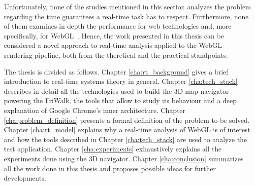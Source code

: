 Unfortunately, none of the studies mentioned in this section analyzes the problem
regarding the time guarantees a real-time task has to respect. Furthermore, none of them
examines in depth the performance for web technologies and, more specifically,
for WebGL~\cite{webgl}. Hence, the work presented in this thesis can be considered
a novel approach to real-time analysis applied to the WebGL rendering pipeline,
both from the theretical and the practical standpoints.

The thesis is divided as follows. Chapter \ref{cha:rt_background}
gives a brief introduction to real-time systems theory in general. Chapter
\ref{cha:tech_stack} describes in detail all the technologies used to build the
3D map navigator powering the FriWalk, the tools that allow to study its
behaviour and a deep explanation of Google Chrome's
inner architecture. Chapter \ref{cha:problem_definition} presents a formal definition
of the problem to be solved. Chapter \ref{cha:rt_model}
explains why a real-time analysis of WebGL is of interest and how the tools
described in Chapter \ref{cha:tech_stack} are used to analyze the test application.
Chapter \ref{cha:experiments} exhaustively explains all the experiments done using
the 3D navigator. Chapter \ref{cha:conclusion} summarizes all the work
done in this thesis and proposes possible ideas for further developments.
